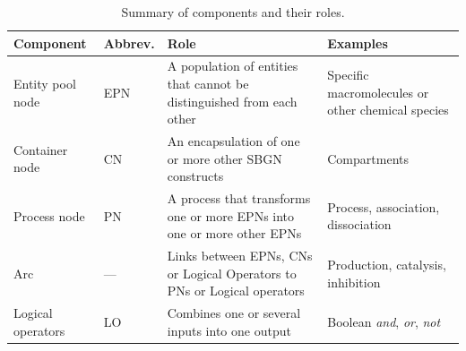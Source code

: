 \begin{table}[bh]
  \centering
  \small
  \begin{tabular}{@{}llP{2.4in}P{1.6in}@{}}
    \toprule
    \textbf{Component} & \textbf{Abbrev.} & \textbf{Role} & \textbf{Examples}\\
    \midrule
    Entity pool node
    & EPN
    & A population of entities that cannot be distinguished from each other
    & Specific macromolecules or other chemical species \\[0.5em]

    Container node	
    & CN
    & An encapsulation of one or more other SBGN constructs
    & Compartments \\[1.6em]

    Process node
    & PN
    & A process that transforms one or more EPNs into one or more other EPNs
    & Process, association, dissociation \\[0.5em]

    Arc
    & ---
    & Links between EPNs, CNs or Logical Operators to PNs or Logical operators
    & Production, catalysis, inhibition \\[0.5em]

    Logical operators
    & LO
    & Combines one or several inputs into one output
    & Boolean \emph{and}, \emph{or}, \emph{not} \\
    \bottomrule
  \end{tabular}
  \caption{Summary of \PD components and their roles.}
  \label{tab:component-summary}
\end{table}



